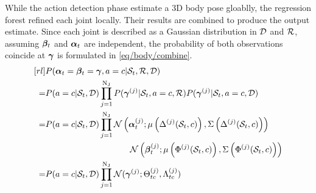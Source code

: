 While the action detection phase estimate a 3D body pose gloablly, the regression forest refined each joint locally. Their results are combined to produce the output estimate. Since each joint is described as a Gaussian distribution in $\mathcal{D}$ and $\mathcal{R}$, assuming $\boldsymbol{\beta}_{t}$ and $\boldsymbol{\alpha}_{t}$ are independent, the probability of both observations coincide at $\boldsymbol{\gamma}$ is formulated in \ref{eq/body/combine}.  
\begin{equation}
	\label{eq/body/combine}
	\begin{aligned}[rl] 
		& P( \bodyposead_{\timenow}=\bodyposepr_{\timenow}=\bodyposez, \action=c| \snippetnow, \forestr, \forestd)\\ 
		= & P(\action=c | \snippetnow, \forestd) \prod_{j = 1}^{\njoints} P( \bodyposez^{(j)} | \snippetnow, \action=c, \forestr) P( \bodyposez^{(j)}  | \snippetnow, \action=c, \forestd) \\
		= &  P(\action = c | \snippetnow, \forestd) \prod_{j= 1} ^{\njoints}
		\normdist\left(\bodyposead^{(j)}_{\timenow}; \mu\left(\toffsetfunc^{(j)}(\snippetnow,c)\right), \Sigma\left(\toffsetfunc^{(j)}(\snippetnow,c)\right)\right) \\ 
		& \hspace{35mm} \normdist\left(\bodyposepr_{\timenow}^{(j)};\mu\left(\Phi^{(j)}(\snippetnow, c)\right),\Sigma\left(\Phi^{(j)}(\snippetnow,c)\right)\right)\\ 
		= &  P(\action=c | \snippetnow, \forestd) \prod_{j = 1}^{\njoints} \normdist(\bodyposez^{(j)}; \finalbodypose^{(j)}_{\timenow c}, \finalvariance^{(j)}_{\timenow c})
	\end{aligned}
\end{equation} 
